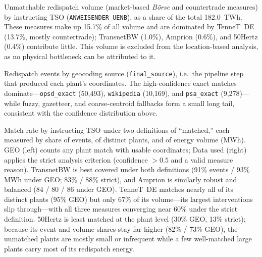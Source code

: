 \caption{Unmatchable redispatch volume (market-based \emph{B\"orse} and
countertrade measures) by instructing TSO (\texttt{ANWEISENDER\_UENB}), as a
share of the total 182.0~TWh. These measures make up 15.7\% of all volume and
are dominated by TenneT~DE (13.7\%, mostly countertrade); TransnetBW (1.0\%),
Amprion (0.6\%), and 50Hertz (0.4\%) contribute little. This volume is excluded
from the location-based analysis, as no physical bottleneck can be attributed to
it.}

\caption{Redispatch events by geocoding source (\texttt{final\_source}), i.e.\
the pipeline step that produced each plant's coordinates. The high-confidence
exact matches dominate---\texttt{opsd\_exact} (50{,}493), \texttt{wikipedia}
(10{,}169), and \texttt{psa\_exact} (9{,}278)---while fuzzy, gazetteer, and
coarse-centroid fallbacks form a small long tail, consistent with the
confidence distribution above.}

\caption{Match rate by instructing TSO under two definitions of ``matched,''
each measured by share of events, of distinct plants, and of energy volume
(MWh). GEO (left) counts any plant match with usable coordinates; Data used
(right) applies the strict analysis criterion (confidence $>0.5$ and a valid
measure reason). TransnetBW is best covered under both definitions (91\%
events / 93\% MWh under GEO; 83\% / 88\% strict), and Amprion is similarly
robust and balanced (84 / 80 / 86 under GEO). TenneT~DE matches nearly all of
its distinct plants (95\% GEO) but only 67\% of its volume---its largest
interventions slip through---with all three measures converging near 60\% under
the strict definition. 50Hertz is least matched at the plant level (30\% GEO,
13\% strict); because its event and volume shares stay far higher (82\% / 73\%
GEO), the unmatched plants are mostly small or infrequent while a few
well-matched large plants carry most of its redispatch energy.}
